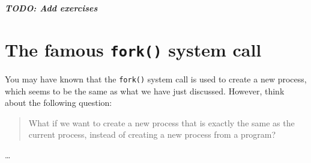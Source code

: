 \textbf{\textit{TODO: Add exercises}}

\section{The famous \texttt{fork()} system call}

You may have known that the \texttt{fork()} system call is used to create a new process, which seems
to be the same as what we have just discussed. However, think about the following question:

\begin{quote}
    What if we want to create a new process that is exactly the same as the current process, instead
    of creating a new process from a program?
\end{quote}

\dots
